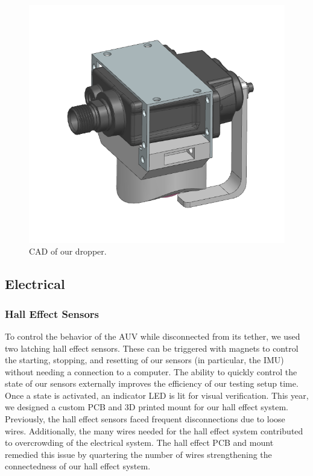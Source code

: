 \documentclass[conference]{IEEEtran}
\begin{document}
\begin{figure}
    \centerline{\includegraphics[scale=0.22]{images/dropperNew.png}}
    \caption{CAD of our dropper.}
    \label{fig:dropper}
\end{figure}


\subsection{Electrical}
\label{ssec:electrical}


\subsubsection{Hall Effect Sensors}
\label{sssec:hall_effects}
To control the behavior of the AUV while disconnected from its tether, we used two latching hall effect sensors. These can be triggered with magnets to control the starting, stopping, and resetting of our sensors (in particular, the IMU) without needing a connection to a computer. The ability to quickly control the state of our sensors externally improves the efficiency of our testing setup time. Once a state is activated, an indicator LED is lit for visual verification. 
This year, we designed a custom PCB and 3D printed mount for our hall effect system. Previously, the hall effect sensors faced frequent disconnections due to loose wires. Additionally, the many wires needed for the hall effect system contributed to overcrowding of the electrical system. The hall effect PCB and mount remedied this issue by quartering the number of wires strengthening the connectedness of our hall effect system.
\end{document}
